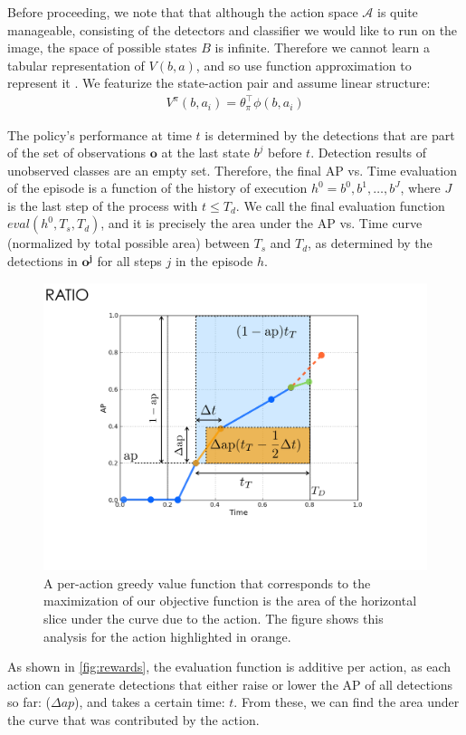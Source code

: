 Before proceeding, we note that that although the action space $\mathcal{A}$ is quite manageable, consisting of the detectors and classifier we would like to run on the image, the space of possible states $B$ is infinite.
Therefore we cannot learn a tabular representation of $V(b,a)$, and so use function approximation to represent it \cite{Sutton1998}.
We featurize the state-action pair and assume linear structure:
\begin{align}
V^\pi(b,a_i) = \theta_\pi^\top  \phi(b,a_i)
\end{align}

The policy's performance at time $t$ is determined by the detections that are part of the set of observations $\mathbf{o}$ at the last state $b^j$ before $t$.
Detection results of unobserved classes are an empty set.
Therefore, the final AP vs. Time evaluation of the episode is a function of the history of execution $h^0=b^0,b^1,\dots,b^J$, where $J$ is the last step of the process with $t \le T_d$.
We call the final evaluation function $eval(h^0,T_s,T_d)$, and it is precisely the area under the AP vs. Time curve (normalized by total possible area) between $T_s$ and $T_d$, as determined by the detections in $\mathbf{o^j}$ for all steps $j$ in the episode $h$.

\begin{figure}[h!]
  \centering
  \includegraphics[width=0.56\linewidth]{../figures/apvst_expl.pdf}
  \caption{A per-action greedy value function that corresponds to the maximization of our objective function is the area of the horizontal slice under the curve due to the action. The figure shows this analysis for the action highlighted in orange.}
  \label{fig:rewards}
\end{figure}

As shown in \autoref{fig:rewards}, the evaluation function is additive per action, as each action can generate detections that either raise or lower the AP of all detections so far: ($\Delta ap$), and takes a certain time: $t$.
From these, we can find the area under the curve that was contributed by the action.

